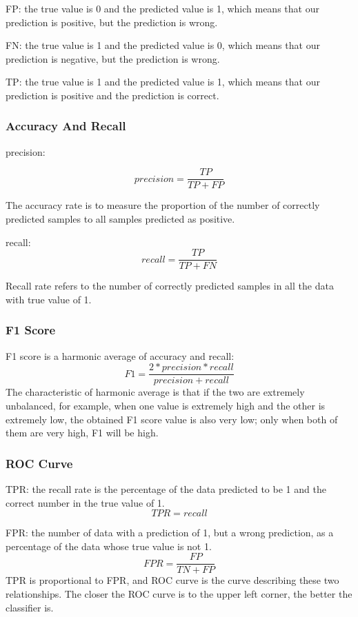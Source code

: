FP:
the true value is 0 and the predicted value is 1,
which means that our prediction is positive,
but the prediction is wrong.

FN:
the true value is 1 and the predicted value is 0,
 which means that our prediction is negative,
  but the prediction is wrong.

TP:
the true value is 1 and the predicted value is 1,
which means that our prediction is positive and the
prediction is correct.

\subsubsection{Accuracy  And Recall}

precision:

\begin{equation}
  precision=\frac{TP}{TP+FP}
\end{equation}

The accuracy rate is to measure the proportion of
the number of correctly predicted samples to all
 samples predicted as positive.

recall:
\begin{equation}
  recall=\frac{TP}{TP+FN}
\end{equation}

Recall rate refers to the number of correctly
predicted samples in all the data with true
value of 1.
\subsubsection{F1 Score}
F1 score is a harmonic average of accuracy and recall:
\begin{equation}
  F1=\frac{2*precision*recall}{precision+recall}
\end{equation}
The characteristic of harmonic average is that if
the two are extremely unbalanced,
for example, when one value is extremely
high and the other is extremely low,
the obtained F1 score value is also very low;
only when both of them are very high,
F1 will be high.
\subsubsection{ROC Curve}
TPR:
the recall rate is the percentage of the data
 predicted to be 1 and the correct number in the
 true value of 1.
 $$TPR=recall$$

FPR:
the number of data with a prediction of 1,
but a wrong prediction,
as a percentage of the data whose true value is not 1.
\begin{equation}
  FPR=\frac{FP}{TN+FP}
\end{equation}
TPR is proportional to FPR,
and ROC curve is the curve describing these two relationships.
The closer the ROC curve is to the upper left corner,
the better the classifier is.
